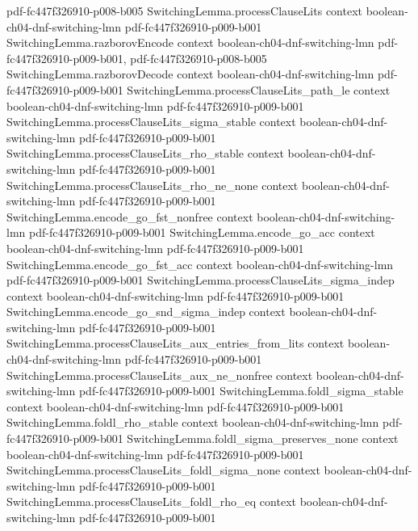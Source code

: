 \begin{theorem}
  {pdf-fc447f326910-p008-b005}
\proofstep
  {SwitchingLemma.processClauseLits}
  {context}
  {boolean-ch04-dnf-switching-lmn}
  {pdf-fc447f326910-p009-b001}
\proofstep
  {SwitchingLemma.razborovEncode}
  {context}
  {boolean-ch04-dnf-switching-lmn}
  {pdf-fc447f326910-p009-b001,
    pdf-fc447f326910-p008-b005}
\proofstep
  {SwitchingLemma.razborovDecode}
  {context}
  {boolean-ch04-dnf-switching-lmn}
  {pdf-fc447f326910-p009-b001}
\proofstep
  {SwitchingLemma.processClauseLits_path_le}
  {context}
  {boolean-ch04-dnf-switching-lmn}
  {pdf-fc447f326910-p009-b001}
\proofstep
  {SwitchingLemma.processClauseLits_sigma_stable}
  {context}
  {boolean-ch04-dnf-switching-lmn}
  {pdf-fc447f326910-p009-b001}
\proofstep
  {SwitchingLemma.processClauseLits_rho_stable}
  {context}
  {boolean-ch04-dnf-switching-lmn}
  {pdf-fc447f326910-p009-b001}
\proofstep
  {SwitchingLemma.processClauseLits_rho_ne_none}
  {context}
  {boolean-ch04-dnf-switching-lmn}
  {pdf-fc447f326910-p009-b001}
\proofstep
  {SwitchingLemma.encode_go_fst_nonfree}
  {context}
  {boolean-ch04-dnf-switching-lmn}
  {pdf-fc447f326910-p009-b001}
\proofstep
  {SwitchingLemma.encode_go_acc}
  {context}
  {boolean-ch04-dnf-switching-lmn}
  {pdf-fc447f326910-p009-b001}
\proofstep
  {SwitchingLemma.encode_go_fst_acc}
  {context}
  {boolean-ch04-dnf-switching-lmn}
  {pdf-fc447f326910-p009-b001}
\proofstep
  {SwitchingLemma.processClauseLits_sigma_indep}
  {context}
  {boolean-ch04-dnf-switching-lmn}
  {pdf-fc447f326910-p009-b001}
\proofstep
  {SwitchingLemma.encode_go_snd_sigma_indep}
  {context}
  {boolean-ch04-dnf-switching-lmn}
  {pdf-fc447f326910-p009-b001}
\proofstep
  {SwitchingLemma.processClauseLits_aux_entries_from_lits}
  {context}
  {boolean-ch04-dnf-switching-lmn}
  {pdf-fc447f326910-p009-b001}
\proofstep
  {SwitchingLemma.processClauseLits_aux_ne_nonfree}
  {context}
  {boolean-ch04-dnf-switching-lmn}
  {pdf-fc447f326910-p009-b001}
\proofstep
  {SwitchingLemma.foldl_sigma_stable}
  {context}
  {boolean-ch04-dnf-switching-lmn}
  {pdf-fc447f326910-p009-b001}
\proofstep
  {SwitchingLemma.foldl_rho_stable}
  {context}
  {boolean-ch04-dnf-switching-lmn}
  {pdf-fc447f326910-p009-b001}
\proofstep
  {SwitchingLemma.foldl_sigma_preserves_none}
  {context}
  {boolean-ch04-dnf-switching-lmn}
  {pdf-fc447f326910-p009-b001}
\proofstep
  {SwitchingLemma.processClauseLits_foldl_sigma_none}
  {context}
  {boolean-ch04-dnf-switching-lmn}
  {pdf-fc447f326910-p009-b001}
\proofstep
  {SwitchingLemma.processClauseLits_foldl_rho_eq}
  {context}
  {boolean-ch04-dnf-switching-lmn}
  {pdf-fc447f326910-p009-b001}
\proofstep

\end{theorem}
